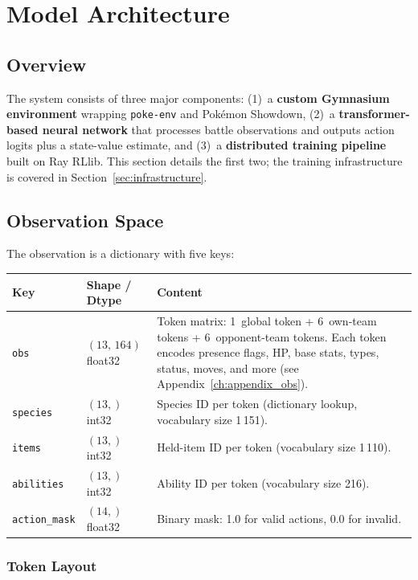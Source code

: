 \section{Model Architecture}
\label{sec:architecture}

\subsection{Overview}

The system consists of three major components: (1)~a \textbf{custom Gymnasium
environment} wrapping \texttt{poke-env} and Pok\'{e}mon Showdown, (2)~a
\textbf{transformer-based neural network} that processes battle observations
and outputs action logits plus a state-value estimate, and (3)~a
\textbf{distributed training pipeline} built on Ray RLlib.  This section
details the first two; the training infrastructure is covered in
Section~\ref{sec:infrastructure}.

\subsection{Observation Space}

The observation is a dictionary with five keys:

\begin{center}
\small
\begin{tabularx}{\textwidth}{l l X}
  \toprule
  \textbf{Key} & \textbf{Shape / Dtype} & \textbf{Content} \\
  \midrule
  \texttt{obs}          & $(13,\,164)$ float32 &
    Token matrix: 1~global token + 6~own-team tokens + 6~opponent-team
    tokens.  Each token encodes presence flags, HP, base stats, types,
    status, moves, and more (see Appendix~\ref{ch:appendix_obs}). \\
  \texttt{species}      & $(13,)$ int32 &
    Species ID per token (dictionary lookup, vocabulary size 1\,151). \\
  \texttt{items}        & $(13,)$ int32 &
    Held-item ID per token (vocabulary size 1\,110). \\
  \texttt{abilities}    & $(13,)$ int32 &
    Ability ID per token (vocabulary size 216). \\
  \texttt{action\_mask} & $(14,)$ float32 &
    Binary mask: 1.0 for valid actions, 0.0 for invalid. \\
  \bottomrule
\end{tabularx}
\end{center}

\subsubsection{Token Layout}

